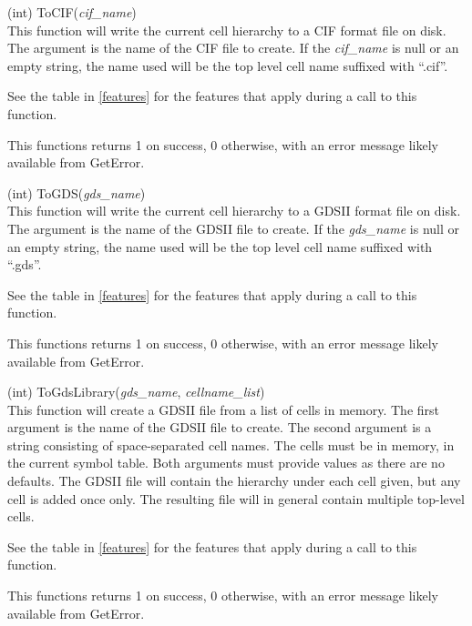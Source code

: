\begin{description}
\item{(int) \vt ToCIF({\it cif\_name\/})}\\
This function will write the current cell hierarchy to a CIF format
file on disk.  The argument is the name of the CIF file to create.  If
the {\it cif\_name\/} is null or an empty string, the name used will
be the top level cell name suffixed with ``{\vt .cif}''.

See the table in \ref{features} for the features that apply during a
call to this function.

This functions returns 1 on success, 0 otherwise, with an error
message likely available from {\vt GetError}.

\item{(int) \vt ToGDS({\it gds\_name\/})}\\
This function will write the current cell hierarchy to a GDSII format
file on disk.  The argument is the name of the GDSII file to create. 
If the {\it gds\_name\/} is null or an empty string, the name used
will be the top level cell name suffixed with ``{\vt .gds}''.

See the table in \ref{features} for the features that apply during a
call to this function.

This functions returns 1 on success, 0 otherwise, with an error
message likely available from {\vt GetError}.

\item{(int) \vt ToGdsLibrary({\it gds\_name}, {\it cellname\_list\/})}\\
This function will create a GDSII file from a list of cells in memory. 
The first argument is the name of the GDSII file to create.  The
second argument is a string consisting of space-separated cell names. 
The cells must be in memory, in the current symbol table.  Both
arguments must provide values as there are no defaults.  The GDSII
file will contain the hierarchy under each cell given, but any cell is
added once only.  The resulting file will in general contain multiple
top-level cells.

See the table in \ref{features} for the features that apply during a
call to this function.

This functions returns 1 on success, 0 otherwise, with an error
message likely available from {\vt GetError}.


\end{description}
